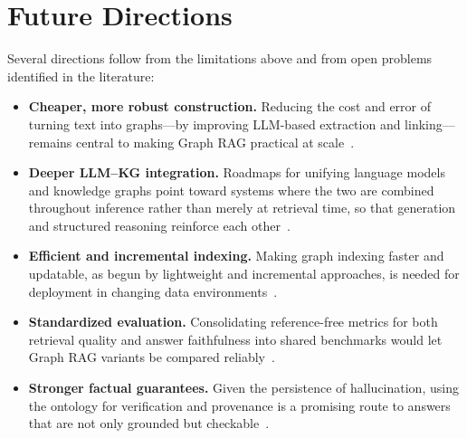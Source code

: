 \section{Future Directions}
\label{sec:gr-future}

Several directions follow from the limitations above and from open problems
identified in the literature:

\begin{itemize}
    \item \textbf{Cheaper, more robust construction.} Reducing the cost and error
    of turning text into graphs---by improving LLM-based extraction and
    linking---remains central to making Graph RAG practical at
    scale~\cite{pan2024unifying, ji2021kgsurvey}.

    \item \textbf{Deeper LLM--KG integration.} Roadmaps for unifying language
    models and knowledge graphs point toward systems where the two are combined
    throughout inference rather than merely at retrieval time, so that generation
    and structured reasoning reinforce each other~\cite{pan2024unifying}.

    \item \textbf{Efficient and incremental indexing.} Making graph indexing
    faster and updatable, as begun by lightweight and incremental
    approaches, is needed for deployment in changing data
    environments~\cite{guo2024lightrag}.

    \item \textbf{Standardized evaluation.} Consolidating reference-free metrics
    for both retrieval quality and answer faithfulness into shared benchmarks
    would let Graph RAG variants be compared reliably~\cite{es2024ragas,
    min2023factscore}.

    \item \textbf{Stronger factual guarantees.} Given the persistence of
    hallucination, using the ontology for verification and provenance is a
    promising route to answers that are not only grounded but
    checkable~\cite{ji2023hallucination, pan2024unifying}.
\end{itemize}
